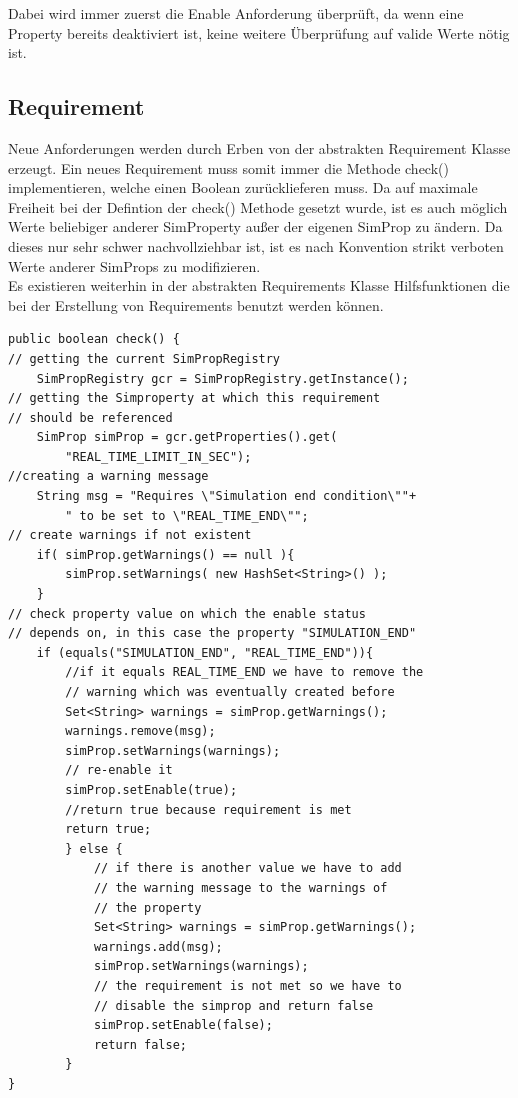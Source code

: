 \documentclass[a4paper, 11pt]{article} %
\begin{document}
Dabei wird immer zuerst die Enable Anforderung überprüft, da wenn eine Property bereits deaktiviert ist, keine weitere Überprüfung auf valide Werte nötig ist.
\subsection{Requirement}
\label{ssub:Requirements}
Neue Anforderungen werden durch Erben von der abstrakten Requirement Klasse erzeugt. Ein neues Requirement muss somit immer die Methode check() implementieren, welche einen Boolean zurücklieferen muss. Da auf maximale Freiheit bei der Defintion der check() Methode gesetzt wurde, ist es auch möglich Werte beliebiger anderer SimProperty außer der eigenen SimProp zu ändern. Da dieses nur sehr schwer nachvollziehbar ist, ist es nach Konvention strikt verboten Werte anderer SimProps zu modifizieren.\\

Es existieren weiterhin in der abstrakten Requirements Klasse Hilfsfunktionen die bei der Erstellung von Requirements benutzt werden können.


\begin{lstlisting}[caption={Beispiel: check() Methode einer Enable Anforderung}]
public boolean check() {
// getting the current SimPropRegistry
	SimPropRegistry gcr = SimPropRegistry.getInstance();
// getting the Simproperty at which this requirement 
// should be referenced
	SimProp simProp = gcr.getProperties().get(
		"REAL_TIME_LIMIT_IN_SEC");
//creating a warning message
	String msg = "Requires \"Simulation end condition\""+
	 	" to be set to \"REAL_TIME_END\"";
// create warnings if not existent
	if( simProp.getWarnings() == null ){
		simProp.setWarnings( new HashSet<String>() );
	}
// check property value on which the enable status 
// depends on, in this case the property "SIMULATION_END"
	if (equals("SIMULATION_END", "REAL_TIME_END")){
		//if it equals REAL_TIME_END we have to remove the 
		// warning which was eventually created before
		Set<String> warnings = simProp.getWarnings();
		warnings.remove(msg);
		simProp.setWarnings(warnings);
		// re-enable it
		simProp.setEnable(true);
		//return true because requirement is met
		return true;
		} else {
			// if there is another value we have to add 
			// the warning message to the warnings of 
			// the property
			Set<String> warnings = simProp.getWarnings();
			warnings.add(msg);
			simProp.setWarnings(warnings);
			// the requirement is not met so we have to 
			// disable the simprop and return false
			simProp.setEnable(false);
			return false;
		}
}
\end{lstlisting}
\end{document}
